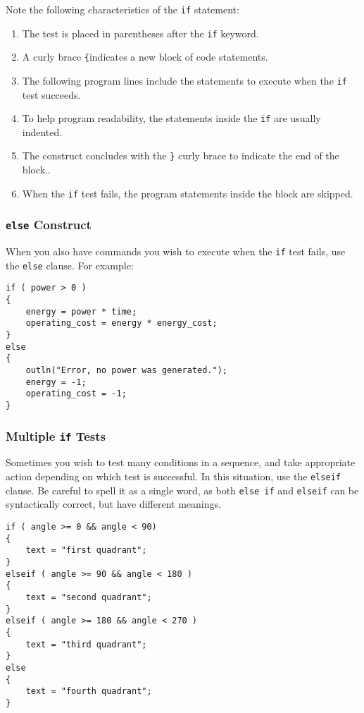 \documentclass{article}
\begin{document}
Note the following characteristics of the \texttt{if} statement:

\begin{enumerate}
\item The test is placed in parentheses after the \texttt{if} keyword.
\item A curly brace \texttt{\{}indicates a new block of code statements.
\item The following program lines include the statements to execute when the \texttt{if} test succeeds.
\item To help program readability, the statements inside the \texttt{if} are usually indented.
\item The construct concludes with the \texttt{\}} curly brace to indicate the end of the block..
\item When the \texttt{if} test fails, the program statements inside the block are skipped.
\end{enumerate}

\subsubsection{\texttt{else} Construct}

When you also have commands you wish to execute when the \texttt{if} test fails, use the \texttt{else} clause. For example:

\begin{verbatim}
if ( power > 0 )
{
    energy = power * time;
    operating_cost = energy * energy_cost;
}
else
{
    outln("Error, no power was generated.");
    energy = -1;
    operating_cost = -1;
}
\end{verbatim}

\subsubsection{Multiple \texttt{if} Tests}

Sometimes you wish to test many conditions in a sequence, and take appropriate action depending on which test is successful.  In this situation, use the \texttt{elseif} clause.  Be careful to spell it as a single word, as both \texttt{else if} and \texttt{elseif} can be syntactically correct, but have different meanings.

\begin{verbatim}
if ( angle >= 0 && angle < 90)
{
    text = "first quadrant";
}
elseif ( angle >= 90 && angle < 180 )
{
    text = "second quadrant";
}
elseif ( angle >= 180 && angle < 270 )
{
    text = "third quadrant";
}
else
{
    text = "fourth quadrant";
}
\end{verbatim}
\end{document}
